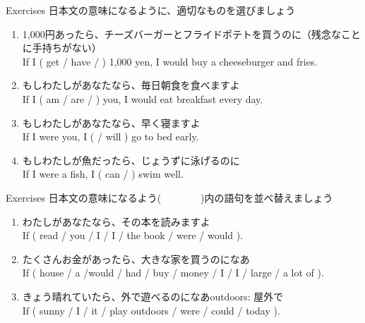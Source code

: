 \documentclass[aspectratio=169,xcolor={dvipsnames,table}]{beamer}
\begin{document}
\begin{frame}[plain]{Exercises}
 日本文の意味になるように、適切なものを選びましょう\hfill{} 

\begin{enumerate}
 \item 1,000円あったら、チーズバーガーとフライドポテトを買うのに（残念なことに手持ちがない）\\
If I ( get / have /  ) 1,000 yen, I would buy a cheeseburger and fries.
 \item もしわたしがあなたなら、毎日朝食を食べますよ\\
If I ( am / are /  ) you, I would eat breakfast every day. 
 \item もしわたしがあなたなら、早く寝ますよ\\
If I were you, I (  / will ) go to bed early.
\item もしわたしが魚だったら、じょうずに泳げるのに\\
If I were a fish, I ( can /   ) swim well.
\end{enumerate}
\end{frame}
\begin{frame}[plain]{Exercises}
日本文の意味になるよう(~~~~~~~~)内の語句を並べ替えましょう\hfill{} 
 \begin{enumerate}
  \item わたしがあなたなら、その本を読みますよ\\
If ( read / you / I / I / the book / were / would  ).\\
  \item たくさんお金があったら、大きな家を買うのになあ\\
If ( house / a /would / had / buy / money / I / I / large / a lot of ).\\
  \item きょう晴れていたら、外で遊べるのになあ\hfill{\scriptsize outdoors: 屋外で}\\
If ( sunny / I / it / play outdoors / were / could / today ).\\

 \end{enumerate}
\end{frame}
\end{document}
